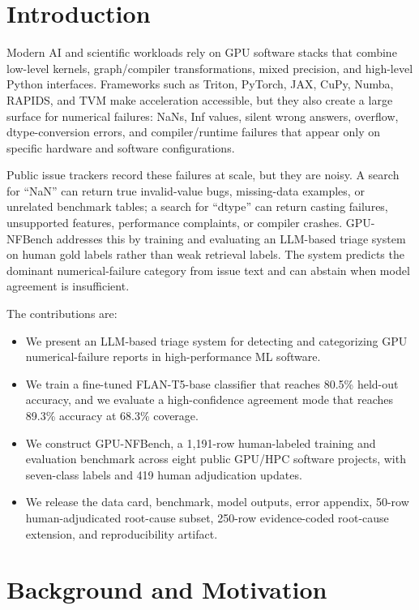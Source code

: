 \documentclass[conference]{IEEEtran}
\newcommand{\bench}{GPU-NFBench}
\begin{document}
\section{Introduction}

Modern AI and scientific workloads rely on GPU software stacks that combine
low-level kernels, graph/compiler transformations, mixed precision, and
high-level Python interfaces. Frameworks such as Triton, PyTorch, JAX, CuPy,
Numba, RAPIDS, and TVM make acceleration accessible, but they also create a
large surface for numerical failures: NaNs, Inf values, silent wrong answers,
overflow, dtype-conversion errors, and compiler/runtime failures that appear
only on specific hardware and software configurations.

Public issue trackers record these failures at scale, but they are noisy. A
search for ``NaN'' can return true invalid-value bugs, missing-data examples,
or unrelated benchmark tables; a search for ``dtype'' can return casting
failures, unsupported features, performance complaints, or compiler crashes.
\bench{} addresses this by training and evaluating an LLM-based triage system
on human gold labels rather than weak retrieval labels. The system predicts the
dominant numerical-failure category from issue text and can abstain when model
agreement is insufficient.

The contributions are:
\begin{itemize}
    \item We present an LLM-based triage system for detecting and categorizing
    GPU numerical-failure reports in high-performance ML software.
    \item We train a fine-tuned FLAN-T5-base classifier that reaches 80.5\%
    held-out accuracy, and we evaluate a high-confidence agreement mode that
    reaches 89.3\% accuracy at 68.3\% coverage.
    \item We construct \bench{}, a 1,191-row human-labeled training and
    evaluation benchmark across eight public GPU/HPC software projects, with
    seven-class labels and 419 human adjudication updates.
    \item We release the data card, benchmark, model outputs, error appendix,
    50-row human-adjudicated root-cause subset, 250-row evidence-coded
    root-cause extension, and reproducibility artifact.
\end{itemize}

\section{Background and Motivation}
\end{document}
